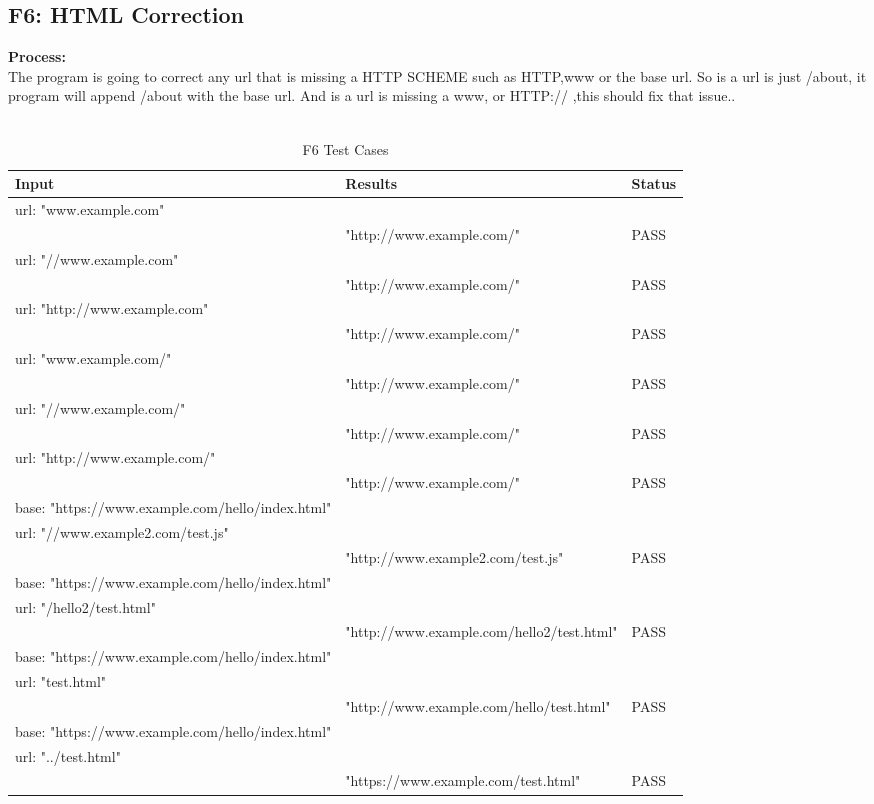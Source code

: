 \documentclass[12pt, titlepage]{article}
\begin{document}
\subsection{F6: HTML Correction}
\textbf{Process:}\\
The program is going to correct any url that is missing a HTTP SCHEME such as HTTP,www or the base url. So is a url is just /about, it program will append /about with the base url. And is a url is missing a www, or HTTP:// ,this should fix that issue..\\\\
\begin{table}[h!]
\centering
\begin{tabular}{ p{4cm}  p{8cm}  p{2cm} }
	Input &Results & Status\\ \hline
	url: "www.example.com"\\
	&"http://www.example.com/" & PASS\\ \hline
	url: "//www.example.com"\\
	 & "http://www.example.com/" & PASS\\ \hline
	url: "http://www.example.com"\\
	 &"http://www.example.com/"& PASS\\ \hline
	url: "www.example.com/"\\
	 & "http://www.example.com/"& PASS\\ \hline
	url: "//www.example.com/"\\
	 & "http://www.example.com/" & PASS\\ \hline
	url: "http://www.example.com/"\\
	&"http://www.example.com/" & PASS\\ \hline
	base: "https://www.example.com/hello/index.html"\\
	url: "//www.example2.com/test.js"\\
	&"http://www.example2.com/test.js" & PASS\\ \hline
	base: "https://www.example.com/hello/index.html"\\
	url: "/hello2/test.html"\\
	 & "http://www.example.com/hello2/test.html" & PASS\\ \hline
	base: "https://www.example.com/hello/index.html"\\
	url: "test.html"\\
	 &"http://www.example.com/hello/test.html"& PASS\\ \hline
	base: "https://www.example.com/hello/index.html"\\
	url: "../test.html" \\
	 & "https://www.example.com/test.html"& PASS\\ \hline

	
	
\end{tabular}
\caption{F6 Test Cases}
\label{table:F6 Test Cases}
\end{table}
\end{document}
